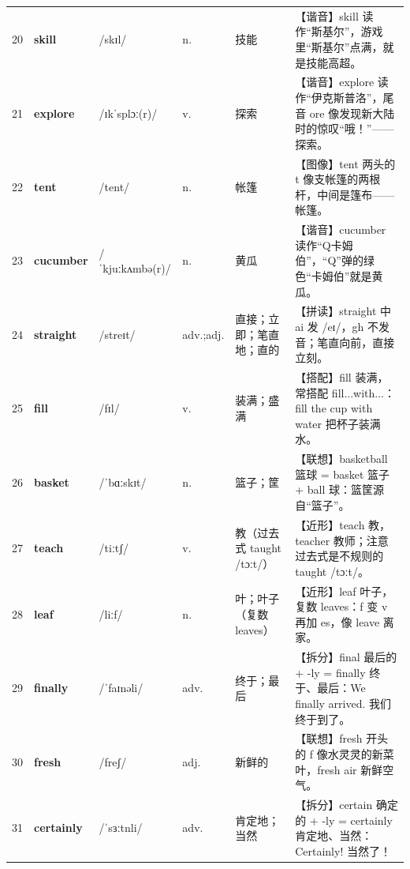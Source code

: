 \documentclass[UTF8,a4paper,11pt,oneside]{ctexbook}
\newcommand{\cellword}[1]{{\bfseries\textcolor{wordcol}{#1}}}
\newcommand{\cellipa}[1]{{\footnotesize\textcolor{ipacol}{#1}}}
\newcommand{\cellpos}[1]{\textcolor{poscol}{#1}}
\newcommand{\cellno}[1]{\textcolor{volcolor!75!black}{#1}}
\begin{document}
{\begin{longtable}{@{}C{0.045\textwidth}L{0.155\textwidth}L{0.175\textwidth}C{0.070\textwidth}L{0.180\textwidth}L{0.282\textwidth}@{}}
\cellno{20} & \cellword{skill} & \cellipa{/skɪl/} & \cellpos{n.} & 技能 & \textcolor{tagSound}{【谐音】}skill 读作“斯基尔”，游戏里“斯基尔”点满，就是技能高超。 \\
 \cellno{21} & \cellword{explore} & \cellipa{/ɪkˈsplɔː(r)/} & \cellpos{v.} & 探索 & \textcolor{tagSound}{【谐音】}explore 读作“伊克斯普洛”，尾音 ore 像发现新大陆时的惊叹“哦！”——探索。 \\
\cellno{22} & \cellword{tent} & \cellipa{/tent/} & \cellpos{n.} & 帐篷 & \textcolor{tagImage}{【图像】}tent 两头的 t 像支帐篷的两根杆，中间是篷布——帐篷。 \\
 \cellno{23} & \cellword{cucumber} & \cellipa{/ˈkjuːkʌmbə(r)/} & \cellpos{n.} & 黄瓜 & \textcolor{tagSound}{【谐音】}cucumber 读作“Q卡姆伯”，“Q”弹的绿色“卡姆伯”就是黄瓜。 \\
\cellno{24} & \cellword{straight} & \cellipa{/streɪt/} & \cellpos{adv.;\allowbreak{}adj.} & 直接；立即；笔直地；直的 & \textcolor{tagSpell}{【拼读】}straight 中 ai 发 /eɪ/，gh 不发音；笔直向前，直接立刻。 \\
 \cellno{25} & \cellword{fill} & \cellipa{/fɪl/} & \cellpos{v.} & 装满；盛满 & \textcolor{tagColloc}{【搭配】}fill 装满，常搭配 fill...with...：fill the cup with water 把杯子装满水。 \\
\cellno{26} & \cellword{basket} & \cellipa{/ˈbɑːskɪt/} & \cellpos{n.} & 篮子；筐 & \textcolor{tagAssoc}{【联想】}basketball 篮球 = basket 篮子 + ball 球：篮筐源自“篮子”。 \\
 \cellno{27} & \cellword{teach} & \cellipa{/tiːtʃ/} & \cellpos{v.} & 教（过去式 taught /tɔːt/） & \textcolor{tagNear}{【近形】}teach 教，teacher 教师；注意过去式是不规则的 taught /tɔːt/。 \\
\cellno{28} & \cellword{leaf} & \cellipa{/liːf/} & \cellpos{n.} & 叶；叶子（复数 leaves） & \textcolor{tagNear}{【近形】}leaf 叶子，复数 leaves：f 变 v 再加 es，像 leave 离家。 \\
 \cellno{29} & \cellword{finally} & \cellipa{/ˈfaɪnəli/} & \cellpos{adv.} & 终于；最后 & \textcolor{tagSplit}{【拆分】}final 最后的 + -ly = finally 终于、最后：We finally arrived. 我们终于到了。 \\
\cellno{30} & \cellword{fresh} & \cellipa{/freʃ/} & \cellpos{adj.} & 新鲜的 & \textcolor{tagAssoc}{【联想】}fresh 开头的 f 像水灵灵的新菜叶，fresh air 新鲜空气。 \\
 \cellno{31} & \cellword{certainly} & \cellipa{/ˈsɜːtnli/} & \cellpos{adv.} & 肯定地；当然 & \textcolor{tagSplit}{【拆分】}certain 确定的 + -ly = certainly 肯定地、当然：Certainly! 当然了！ \\

\end{longtable}}
\end{document}
